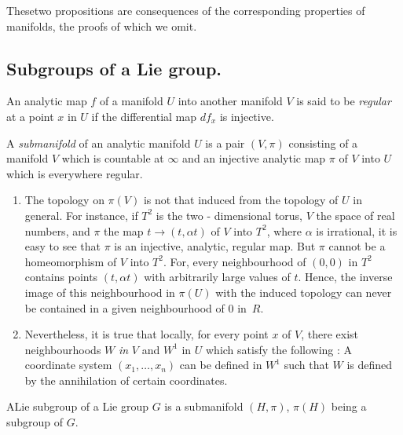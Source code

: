 These\pageoriginale two propositions are consequences of the corresponding
properties of manifolds, the proofs of which we omit. 


\subsection{Subgroups of a Lie group.}\label{chap3-sec3.2}%

\begin{defi*}%
An analytic map $f$ of a manifold $U$ into another manifold $V$ is
 said to be {\em regular} at a point $x$ in $U$ if the differential
 map $df_x$ is injective. 
\end{defi*}

\begin{defi*}%
A {\em submanifold} of an analytic manifold $U$ is a pair $(V, \pi)$
consisting of a manifold $V$ which is countable at $\infty$ and an
injective analytic map $\pi$ of $V$ into $U$ which is everywhere
regular. 
\end{defi*}

\begin{remarks*}
\begin{enumerate}
\renewcommand{\labelenumi}{(\theenumi)}
\item The topology on $\pi (V)$ is not that induced from the topology
  of $U$ in general. For instance, if $T^2$ is the two - dimensional
  torus, $V$ the space of real numbers, and $\pi$ the map $t
  \rightarrow (t, \alpha t)$ of $V$ into $T^2$, where $\alpha$ is
  irrational, it is easy to see that $\pi$ is an injective, analytic,
  regular map. But $\pi$ cannot be a homeomorphism of $V$ into
  $T^2$. For, every neighbourhood of $(0 ,0)$ in $T^2$ contains points
  $(t, \alpha t)$ with arbitrarily large values of $t$. Hence, the
  inverse image of this neighbourhood in $\pi (U)$ with the induced
  topology can never be contained in a given neighbourhood of $0$ 
  in~$R$. 

\item Nevertheless, it is true that locally, for every point $x$ of
  $V$, there exist neighbourhoods $W$ \textit{in} $V$ and $W^1$ in $U$
  which satisfy the following : A coordinate system $(x_1, \ldots ,
  x_n)$ can be defined in $W^1$ such that $W$ is defined by the
  annihilation of certain coordinates. 
\end{enumerate}
\end{remarks*}

\begin{defi*}%
 A\pageoriginale Lie subgroup of a Lie group $G$ is a submanifold $(H,
 \pi)$, $\pi(H)$ being a subgroup of $G$. 
\end{defi*}

